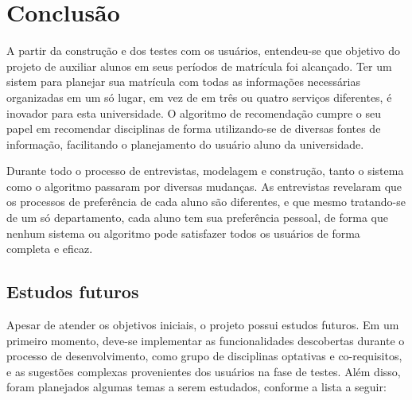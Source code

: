 \chapter{Conclusão}
\label{cha:Conclusão}

A partir da construção e dos testes com os usuários, entendeu-se que objetivo do projeto de auxiliar alunos em seus períodos de matrícula foi alcançado.
Ter um sistem para planejar sua matrícula com todas as informações necessárias organizadas em um só lugar, em vez de em três ou quatro serviços diferentes, é inovador
para esta universidade. O algoritmo de recomendação cumpre o seu papel em recomendar disciplinas de forma utilizando-se de diversas fontes de informação, facilitando
o planejamento do usuário aluno da universidade.

Durante todo o processo de entrevistas, modelagem e construção, tanto o sistema como o algoritmo passaram por diversas mudanças. As entrevistas revelaram que os
processos de preferência de cada aluno são diferentes, e que mesmo tratando-se de um só departamento, cada aluno tem sua preferência pessoal, de forma que nenhum
sistema ou algoritmo pode satisfazer todos os usuários de forma completa e eficaz.

\section{Estudos futuros}

Apesar de atender os objetivos iniciais, o projeto possui estudos futuros. Em um primeiro momento, deve-se implementar as funcionalidades descobertas durante o processo de desenvolvimento, como grupo de disciplinas optativas e co-requisitos, e as sugestões complexas provenientes dos usuários na fase de testes. Além disso, foram planejados algumas temas a serem estudados, conforme a lista a seguir:

